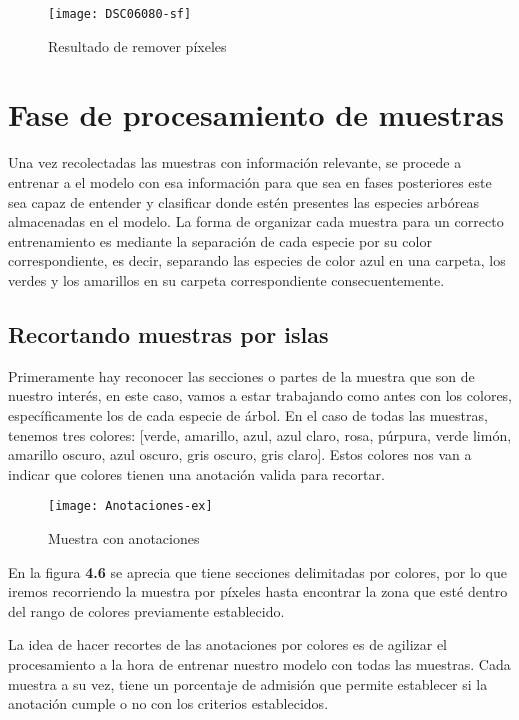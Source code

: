 \begin{figure} [!b]
	\centering
	\begin{minipage}[b]{0.5\textwidth}
		\texttt{[image: DSC06080-sf]}
		\caption{Resultado de remover píxeles}
	\end{minipage}
\end{figure}

\break

\section{Fase de procesamiento de muestras}
Una vez recolectadas las muestras con información relevante, se procede a  entrenar a el modelo con esa información para que sea en fases posteriores este sea capaz de entender y clasificar donde estén presentes las especies arbóreas almacenadas en el modelo. La forma de organizar cada muestra para un correcto entrenamiento es mediante la separación de cada especie por su color correspondiente, es decir, separando las especies de color azul en una carpeta, los verdes y los amarillos en su carpeta correspondiente consecuentemente.

\subsection{Recortando muestras por islas}
Primeramente hay reconocer las secciones o partes de la muestra que son de nuestro interés, en este caso, vamos a estar trabajando como antes con los colores, específicamente los de cada especie de árbol. En el caso de todas las muestras, tenemos tres colores: [verde, amarillo, azul, azul claro, rosa, púrpura, verde limón, amarillo oscuro, azul oscuro, gris oscuro, gris claro]. Estos colores nos van a indicar que colores tienen una anotación valida para recortar.


\begin{figure}[H]
  \centering
  \begin{minipage}[b]{0.5\textwidth}
        \texttt{[image: Anotaciones-ex]}
    \caption{Muestra con anotaciones}
  \end{minipage}
\end{figure}

En la figura \textbf{4.6} se aprecia que tiene secciones delimitadas por colores, por lo que iremos recorriendo la muestra por píxeles hasta encontrar la zona que esté dentro del rango de colores previamente establecido.

La idea de hacer recortes de las anotaciones por colores es de agilizar el procesamiento a la hora de entrenar nuestro modelo con todas las muestras. Cada muestra a su vez, tiene un porcentaje de admisión que permite establecer si la anotación cumple o no con los criterios establecidos.


